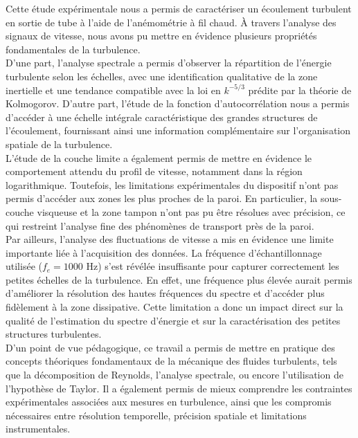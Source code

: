 \documentclass[12pt, a4paper]{report}
\begin{document}
	Cette étude expérimentale nous a permis de caractériser un écoulement turbulent en sortie de tube à l'aide de l'anémométrie à fil chaud. À travers l'analyse des signaux de vitesse, nous avons pu mettre en évidence plusieurs propriétés fondamentales de la turbulence.\\
	
	\noindent D'une part, l'analyse spectrale a permis d'observer la répartition de l'énergie turbulente selon les échelles, avec une identification qualitative de la zone inertielle et une tendance compatible avec la loi en $k^{-5/3}$ prédite par la théorie de Kolmogorov. D'autre part, l'étude de la fonction d'autocorrélation nous a permis d'accéder à une échelle intégrale caractéristique des grandes structures de l'écoulement, fournissant ainsi une information complémentaire sur l'organisation spatiale de la turbulence.\\
	
	\noindent L'étude de la couche limite a également permis de mettre en évidence le comportement attendu du profil de vitesse, notamment dans la région logarithmique. Toutefois, les limitations expérimentales du dispositif n'ont pas permis d'accéder aux zones les plus proches de la paroi. En particulier, la sous-couche visqueuse et la zone tampon n'ont pas pu être résolues avec précision, ce qui restreint l'analyse fine des phénomènes de transport près de la paroi.\\
	
	\noindent Par ailleurs, l'analyse des fluctuations de vitesse a mis en évidence une limite importante liée à l'acquisition des données. La fréquence d'échantillonnage utilisée ($f_e = 1000$ Hz) s'est révélée insuffisante pour capturer correctement les petites échelles de la turbulence. En effet, une fréquence plus élevée aurait permis d'améliorer la résolution des hautes fréquences du spectre et d'accéder plus fidèlement à la zone dissipative. Cette limitation a donc un impact direct sur la qualité de l'estimation du spectre d'énergie et sur la caractérisation des petites structures turbulentes.\\
	
	\noindent D'un point de vue pédagogique, ce travail a permis de mettre en pratique des concepts théoriques fondamentaux de la mécanique des fluides turbulents, tels que la décomposition de Reynolds, l'analyse spectrale, ou encore l'utilisation de l'hypothèse de Taylor. Il a également permis de mieux comprendre les contraintes expérimentales associées aux mesures en turbulence, ainsi que les compromis nécessaires entre résolution temporelle, précision spatiale et limitations instrumentales.\\
		
\end{document}
